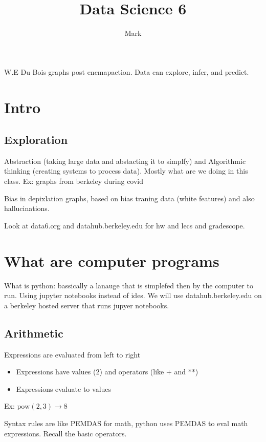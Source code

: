 \documentclass[11pt]{article}
\title{Data Science 6}
\author{Mark}
\date{}
\begin{document}
\maketitle


W.E Du Bois graphs post encmapaction. Data can explore, infer, and predict. 
\section{Intro}
\subsection{Exploration}

Abstraction (taking large data and abstacting it to simplfy) and Algorithmic thinking (creating systems to process data). 
Mostly what are we doing in this class. Ex: graphs from berkeley during covid

Bias in depixlation graphs, based on bias traning data (white features) and also hallucinations. 

Look at data6.org and datahub.berkeley.edu for hw and lecs and gradescope. 

\section{What are computer programs}

What is python: bassically a lanauge that is simplefed then by the computer to run. Using jupyter notebooks instead of ides.  We will use datahub.berkeley.edu on a berkeley hosted server that runs jupyer notebooks.

\subsection{Arithmetic}
Expressions are evaluated from left to right
\begin{itemize}
    \item Expressions have values (2) and operators (like + and **)
    \item Expressions evaluate to values
\end{itemize}

Ex: $\text{pow}(2,3) \rightarrow 8$

Syntax rules are like PEMDAS for math, python uses PEMDAS to eval math expressions. Recall the basic operators. 
\end{document}
